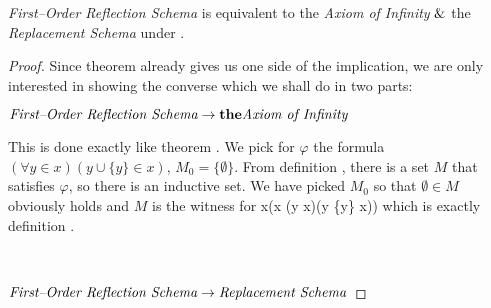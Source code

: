 \begin{theorem}\label{theorem:levy_equivalence_contemporary}
\emph{First–Order Reflection Schema} is equivalent to the \emph{Axiom of Infinity} $ \mathrel{\&} $ the \emph{Replacement Schema} under .
\end{theorem}
\begin{proof}
Since theorem  already gives us one side of the implication, we are only interested in showing the converse which we shall do in two parts:
\bce[(i)]
\item $\bold{\emph{First–Order Reflection Schema} \rightarrow the \emph{Axiom of Infinity}}$

This is done exactly like theorem . We pick for $\varphi$ the formula $(\forall y \in x)(y \cup \{y\} \in x)$, $M_0 = \{\emptyset\}$. From definition , there is a set $M$ that satisfies $\varphi$, so there is an inductive set. We have picked $M_0$ so that $\emptyset \in M$ obviously holds and $M$ is the witness for 
\beq
\exists x(\emptyset \in x \et (\forall y \in x)(y \cup \{y\} \in x))
\eeq
which is exactly definition .

\

\item $\bold{\emph{First–Order Reflection Schema} \rightarrow \emph{Replacement Schema}}$



\end{proof}

